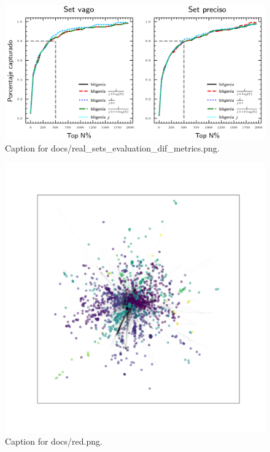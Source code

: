 \documentclass{article}
\begin{document}
\begin{figure}[h] \centering \includegraphics{docs/real_sets_evaluation_dif_metrics.png} \caption{Caption for docs/real_sets_evaluation_dif_metrics.png.} \end{figure}
\begin{figure}[h] \centering \includegraphics{docs/red.png} \caption{Caption for docs/red.png.} \end{figure}
\end{document}
